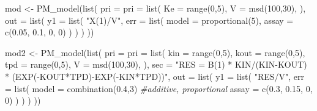 \documentclass[
]{book}
\newenvironment{Shaded}{\begin{snugshade}}{\end{snugshade}}
\newcommand{\AttributeTok}[1]{\textcolor[rgb]{0.77,0.63,0.00}{#1}}
\newcommand{\CommentTok}[1]{\textcolor[rgb]{0.56,0.35,0.01}{\textit{#1}}}
\newcommand{\DecValTok}[1]{\textcolor[rgb]{0.00,0.00,0.81}{#1}}
\newcommand{\FloatTok}[1]{\textcolor[rgb]{0.00,0.00,0.81}{#1}}
\newcommand{\FunctionTok}[1]{\textcolor[rgb]{0.00,0.00,0.00}{#1}}
\newcommand{\NormalTok}[1]{#1}
\newcommand{\OtherTok}[1]{\textcolor[rgb]{0.56,0.35,0.01}{#1}}
\newcommand{\StringTok}[1]{\textcolor[rgb]{0.31,0.60,0.02}{#1}}
\begin{document}
\begin{Shaded}
\begin{Highlighting}[]
\NormalTok{mod }\OtherTok{\textless{}{-}} \FunctionTok{PM\_model}\NormalTok{(}\FunctionTok{list}\NormalTok{(}
  \AttributeTok{pri =} \AttributeTok{pri =} \FunctionTok{list}\NormalTok{(}
    \AttributeTok{Ke =} \FunctionTok{range}\NormalTok{(}\DecValTok{0}\NormalTok{,}\DecValTok{5}\NormalTok{),}
    \AttributeTok{V =} \FunctionTok{msd}\NormalTok{(}\DecValTok{100}\NormalTok{,}\DecValTok{30}\NormalTok{),}
\NormalTok{  ),}
  \AttributeTok{out =} \FunctionTok{list}\NormalTok{(}
    \AttributeTok{y1 =} \FunctionTok{list}\NormalTok{(}
      \StringTok{"X(1)/V"}\NormalTok{,}
      \AttributeTok{err =} \FunctionTok{list}\NormalTok{(}
        \AttributeTok{model =} \FunctionTok{proportional}\NormalTok{(}\DecValTok{5}\NormalTok{),}
        \AttributeTok{assay =} \FunctionTok{c}\NormalTok{(}\FloatTok{0.05}\NormalTok{, }\FloatTok{0.1}\NormalTok{, }\DecValTok{0}\NormalTok{, }\DecValTok{0}\NormalTok{)}
\NormalTok{      )}
\NormalTok{    )}
\NormalTok{  )}
\NormalTok{))}

\NormalTok{mod2 }\OtherTok{\textless{}{-}} \FunctionTok{PM\_model}\NormalTok{(}\FunctionTok{list}\NormalTok{(}
  \AttributeTok{pri =} \AttributeTok{pri =} \FunctionTok{list}\NormalTok{(}
    \AttributeTok{kin =} \FunctionTok{range}\NormalTok{(}\DecValTok{0}\NormalTok{,}\DecValTok{5}\NormalTok{),}
    \AttributeTok{kout =} \FunctionTok{range}\NormalTok{(}\DecValTok{0}\NormalTok{,}\DecValTok{5}\NormalTok{),}
    \AttributeTok{tpd =} \FunctionTok{range}\NormalTok{(}\DecValTok{0}\NormalTok{,}\DecValTok{5}\NormalTok{),}
    \AttributeTok{V =} \FunctionTok{msd}\NormalTok{(}\DecValTok{100}\NormalTok{,}\DecValTok{30}\NormalTok{),}
\NormalTok{  ),}
  \AttributeTok{sec =} \StringTok{"RES = B(1) * KIN/(KIN{-}KOUT) * (EXP({-}KOUT*TPD){-}EXP({-}KIN*TPD))"}\NormalTok{,}
  \AttributeTok{out =} \FunctionTok{list}\NormalTok{(}
    \AttributeTok{y1 =} \FunctionTok{list}\NormalTok{(}
      \StringTok{"RES/V"}\NormalTok{,}
      \AttributeTok{err =} \FunctionTok{list}\NormalTok{(}
        \AttributeTok{model =} \FunctionTok{combination}\NormalTok{(}\FloatTok{0.4}\NormalTok{,}\DecValTok{3}\NormalTok{) }\CommentTok{\#additive, proportional}
        \AttributeTok{assay =} \FunctionTok{c}\NormalTok{(}\FloatTok{0.3}\NormalTok{, }\FloatTok{0.15}\NormalTok{, }\DecValTok{0}\NormalTok{, }\DecValTok{0}\NormalTok{)}
\NormalTok{      )}
\NormalTok{    )}
\NormalTok{  )}
\NormalTok{))}
\end{Highlighting}
\end{Shaded}
\end{document}
